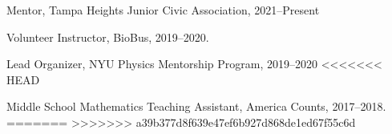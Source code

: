 \documentclass[12pt,letterpaper]{article}
\begin{document}
\begin{list}{}{\cvlist}

\item
  Mentor, Tampa Heights Junior Civic Association, 2021--Present

\item
  Volunteer Instructor, BioBus, 2019--2020.

\item
  Lead Organizer, NYU Physics Mentorship Program, 2019--2020
<<<<<<< HEAD
\item
  Middle School Mathematics Teaching Assistant, America Counts, 2017--2018.
=======
>>>>>>> a39b377d8f639e47ef6b927d868de1ed67f55c6d

\end{list}
\end{document}
